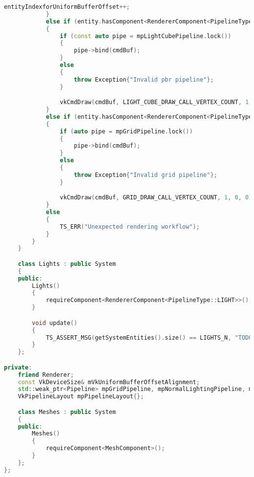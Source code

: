 \begin{itemize}
\begin{lstlisting}[language=c++, caption=Front-end of the rendrer (./engine/src/ecs/systems/render\_system.hpp)]
                entityIndexforUniformBufferOffset++;
            }
            else if (entity.hasComponent<RendererComponent<PipelineType::LIGHT>>())
            {
                if (const auto pipe = mpLightCubePipeline.lock())
                {
                    pipe->bind(cmdBuf);
                }
                else
                {
                    throw Exception{"Invalid pbr pipeline"};
                }

                vkCmdDraw(cmdBuf, LIGHT_CUBE_DRAW_CALL_VERTEX_COUNT, 1, 0, 0);
            }
            else if (entity.hasComponent<RendererComponent<PipelineType::GRID>>())
            {
                if (auto pipe = mpGridPipeline.lock())
                {
                    pipe->bind(cmdBuf);
                }
                else
                {
                    throw Exception{"Invalid grid pipeline"};
                }

                vkCmdDraw(cmdBuf, GRID_DRAW_CALL_VERTEX_COUNT, 1, 0, 0);
            }
            else
            {
                TS_ERR("Unexpected rendering workflow");
            }
        }
    }

    class Lights : public System
    {
    public:
        Lights()
        {
            requireComponent<RendererComponent<PipelineType::LIGHT>>();
        }

        void update()
        {
            TS_ASSERT_MSG(getSystemEntities().size() == LIGHTS_N, "TODO: lights pipeline is prepared for 2 light sources");
        }
    };

private:
    friend Renderer;
    const VkDeviceSize& mVkUniformBufferOffsetAlignment;
    std::weak_ptr<Pipeline> mpGridPipeline, mpNormalLightingPipeline, mpPbrPipeline, mpLightCubePipeline;
    VkPipelineLayout mpPipelineLayout{};

    class Meshes : public System
    {
    public:
        Meshes()
        {
            requireComponent<MeshComponent>();
        }
    };
};
\end{lstlisting}
\end{itemize}

